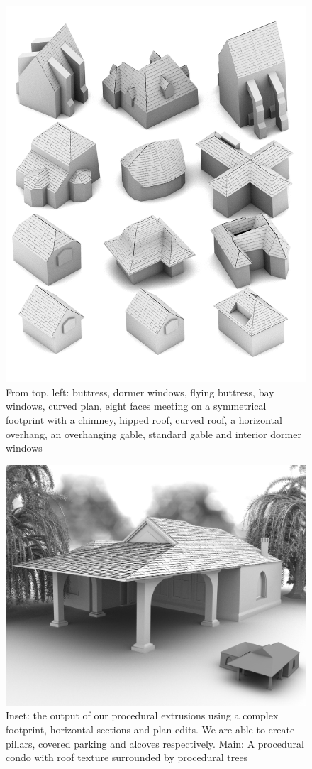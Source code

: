 \begin{figure}
  \centering
  \includegraphics[width=0.7\columnwidth]{multi.png}
  \caption[A range of structures possible with the PE systems]{\label{fig:multi}
From top, left: buttress, dormer windows, flying buttress, bay windows, curved plan, eight faces meeting on a symmetrical footprint with a chimney, hipped roof, curved roof, a horizontal overhang, an overhanging gable, standard gable and interior dormer windows}
\end{figure}

\begin{figure}
  \centering
  \includegraphics[width=1.0\columnwidth]{condo.png}
  \caption[An PE American condo]{\label{fig:condo}
Inset:  the output of our procedural extrusions using a complex footprint, horizontal sections and plan edits. We are able to create pillars, covered parking and alcoves respectively. Main: A procedural condo with roof texture surrounded by procedural trees}
\end{figure}

